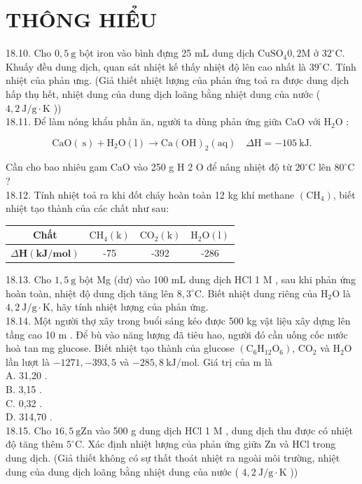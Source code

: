 \documentclass[10pt]{article}
\begin{document}
\section*{THÔNG HIỂU}
18.10. Cho $0,5 \mathrm{~g}$ bột iron vào bình đựng 25 mL dung dịch $\mathrm{CuSO}_{4} 0,2 \mathrm{M}$ ở $32^{\circ} \mathrm{C}$. Khuấy đều dung dịch, quan sát nhiệt kế thấy nhiệt độ lên cao nhất là $39^{\circ} \mathrm{C}$. Tính nhiệt của phản ưng. (Giả thiết nhiệt lượng của phản ứng toả ra được dung dịch hấp thụ hết, nhiệt dung của dung dịch loãng bằng nhiệt dung của nước ( $4,2 \mathrm{~J} / \mathrm{g} \cdot \mathrm{K}$ ))\\
18.11. Để làm nóng khẩu phần ăn, người ta dùng phản ứng giữa CaO với $\mathrm{H}_{2} \mathrm{O}$ :

$$
\mathrm{CaO}(\mathrm{~s})+\mathrm{H}_{2} \mathrm{O}(\mathrm{l}) \rightarrow \mathrm{Ca}(\mathrm{OH})_{2}(\mathrm{aq}) \quad \Delta \mathrm{H}=-105 \mathrm{~kJ} .
$$

Cần cho bao nhiêu gam CaO vào 250 g H 2 O để nâng nhiệt độ từ $20^{\circ} \mathrm{C}$ lên $80^{\circ} \mathrm{C}$ ?\\
18.12. Tính nhiệt toả ra khi đốt cháy hoàn toàn 12 kg khí methane $\left(\mathrm{CH}_{4}\right)$, biết nhiệt tạo thành của các chất như sau:

\begin{center}
\begin{tabular}{|c|c|c|c|}
\hline
Chất & $\mathrm{CH}_{4}(\mathrm{k})$ & $\mathrm{CO}_{2}(\mathrm{k})$ & $\mathrm{H}_{2} \mathrm{O}(\mathrm{l})$ \\
\hline
$\Delta \mathbf{H}(\mathbf{k J} / \mathbf{m o l})$ & -75 & -392 & -286 \\
\hline
\end{tabular}
\end{center}

18.13. Cho $1,5 \mathrm{~g}$ bột Mg (dư) vào 100 mL dung dịch HCl 1 M , sau khi phản ứng hoàn toàn, nhiệt độ dung dịch tăng lên $8,3^{\circ} \mathrm{C}$. Biết nhiệt dung riêng của $\mathrm{H}_{2} \mathrm{O}$ là $4,2 \mathrm{~J} / \mathrm{g} \cdot \mathrm{K}$, hãy tính nhiệt lượng của phản ứng.\\
18.14. Một người thợ xây trong buổi sáng kéo được 500 kg vật liệu xây dựng lên tầng cao 10 m . Để bù vào năng lượng đã tiêu hao, người đó cần uống cốc nước hoà tan mg glucose. Biết nhiệt tạo thành của glucose $\left(\mathrm{C}_{6} \mathrm{H}_{12} \mathrm{O}_{6}\right)$, $\mathrm{CO}_{2}$ và $\mathrm{H}_{2} \mathrm{O}$ lần lượt là $-1271,-393,5$ và $-285,8 \mathrm{~kJ} / \mathrm{mol}$. Giá trị của m là\\
A. 31,20 .\\
B. 3,15 .\\
C. 0,32 .\\
D. 314,70 .\\
18.15. Cho $16,5 \mathrm{~g} \mathrm{Zn}$ vào 500 g dung dịch HCl 1 M , dung dịch thu được có nhiệt độ tăng thêm $5^{\circ} \mathrm{C}$. Xác định nhiệt lượng của phản ứng giữa Zn và HCl trong dung dịch. (Giả thiết không có sự thất thoát nhiệt ra ngoài môi trường, nhiệt dung của dung dịch loãng bằng nhiệt dung của nước ( $4,2 \mathrm{~J} / \mathrm{g} \cdot \mathrm{K}$ ))
\end{document}
